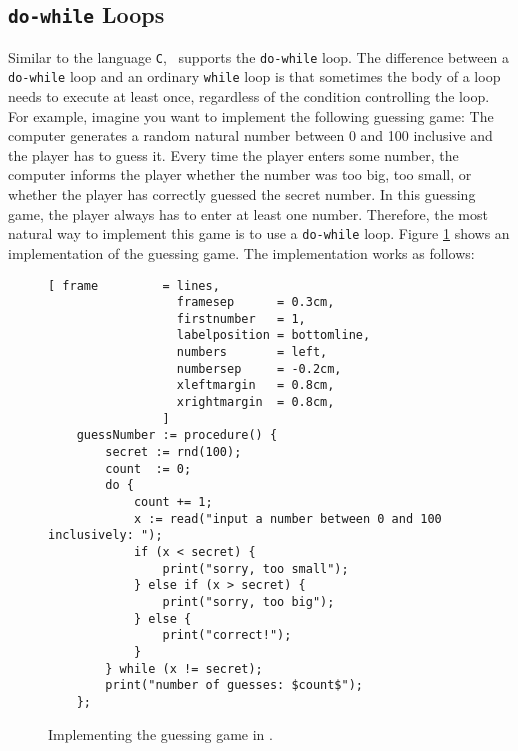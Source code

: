 \subsection{\texttt{do-while} Loops}
Similar to the language \texttt{C}, \setlx\ supports the \texttt{do-while} loop.  The difference
between a \texttt{do-while} loop and an ordinary \texttt{while} loop is that 
sometimes the body of a loop needs to execute at least once, regardless of the condition
controlling the loop.  For example, imagine you want to implement the following guessing game:  The computer
generates a random natural number between 0 and 100 inclusive and the player has to guess it.  Every time the
player enters some number, the computer informs the player whether the number was too big, too
small, or whether the player has correctly guessed the secret number.  In this guessing game, the
player always has to enter at least one number.  Therefore, the most natural way to implement this
game is to use a \texttt{do-while} loop.  Figure \ref{fig:guessNumber.stlx} shows an implementation
of the guessing game.  The implementation works as follows:

\begin{figure}[!ht]
\centering
\begin{Verbatim}[ frame         = lines, 
                  framesep      = 0.3cm, 
                  firstnumber   = 1,
                  labelposition = bottomline,
                  numbers       = left,
                  numbersep     = -0.2cm,
                  xleftmargin   = 0.8cm,
                  xrightmargin  = 0.8cm,
                ]
    guessNumber := procedure() {
        secret := rnd(100);
        count  := 0;
        do {
            count += 1;
            x := read("input a number between 0 and 100 inclusively: ");
            if (x < secret) {
                print("sorry, too small");
            } else if (x > secret) {
                print("sorry, too big");
            } else {
                print("correct!");
            }
        } while (x != secret);
        print("number of guesses: $count$");
    };
\end{Verbatim}
\vspace*{-0.3cm}
\caption{Implementing the guessing game in \setlx.}
\label{fig:guessNumber.stlx}
\end{figure}

